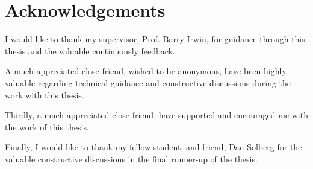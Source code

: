 \chapter*{Acknowledgements}

I would like to thank my supervisor, Prof. Barry Irwin, for guidance through this thesis and the valuable continuously feedback.

A much appreciated close friend, wished to be anonymous, have been highly valuable regarding technical guidance and constructive discussions during the work with this thesis.

Thirdly, a much appreciated close friend, have supported and encouraged me with the work of this thesis.

Finally, I would like to thank my fellow student, and friend, Dan Solberg for the valuable constructive discussions in the final runner-up of the thesis.
